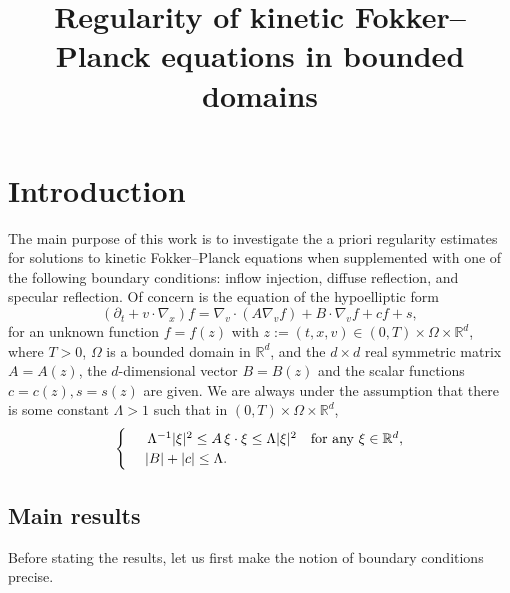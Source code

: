 \documentclass[AHL,Unicode,longabstracts,published]{cedram}
\title[Regularity of kinetic Fokker--Planck equations in bounded domains]{Regularity of kinetic Fokker--Planck equations in bounded domains}
\author[\initial{Y.} \lastname{Zhu}]{\firstname{Yuzhe} \lastname{Zhu}}
\newcommand*\R {\mathbb{R}}
\begin{document}
\maketitle

\pagebreak
\section{Introduction} 

The main purpose of this work is to investigate the a priori regularity estimates for solutions to kinetic Fokker--Planck equations when supplemented with one of the following boundary conditions: inflow injection, diffuse reflection, and specular reflection. Of concern is the equation of the hypoelliptic form
\begin{equation}\label{FP}
\left(\partial_t+v\cdot\nabla_x\right)f =\nabla_v\cdot\left(A\nabla_v f\right)+B\cdot\nabla_vf +cf + s,
\end{equation}
for an unknown function $f=f(z)$ with $z:=(t,x,v)\in(0,T)\times\Omega\times\R^d$, where $T>0$, $\Omega$ is a bounded domain in $\R^d$, and the $d\times d$ real symmetric matrix $A=A(z)$, the $d$-dimensional vector $B=B(z)$ and the scalar functions $c=c(z),s=s(z)$ are given. We are always under the assumption that there is some constant $\Lambda>1$ such that in $(0,T)\times\Omega\times\R^d$,
\begin{equation}\label{H}
\begin{cases}
\ &\,\Lambda^{-1}|\xi|^2\le A\,\xi\cdot\xi\le\Lambda|\xi|^2 {\quad\rm for\ any\ }\xi\in\R^d, \\
\ &|B|+|c|\le\Lambda. \\
\end{cases}
\end{equation}

\subsection{Main results}

Before stating the results, let us first make the notion of boundary conditions precise.
\end{document}
